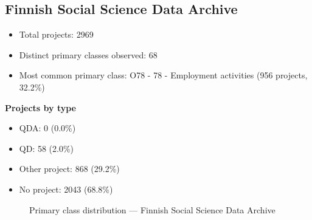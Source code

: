 \subsection{Finnish Social Science Data Archive}

\begin{itemize}
    \item Total projects: 2969
    \item Distinct primary classes observed: 68
    \item Most common primary class: O78 - 78 - Employment activities (956 projects, 32.2\%)
\end{itemize}
\textbf{Projects by type}
\begin{itemize}
    \item QDA: 0 (0.0\%)
    \item QD: 58 (2.0\%)
    \item Other project: 868 (29.2\%)
    \item No project: 2043 (68.8\%)
\end{itemize}

\begin{figure}[h]
    \centering
    
    \caption{Primary class distribution --- Finnish Social Science Data Archive}
\end{figure}


